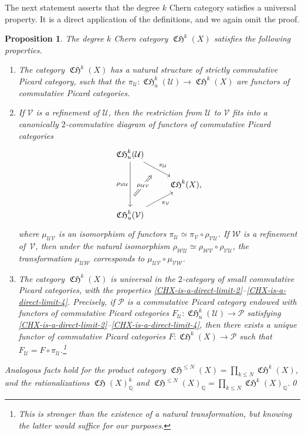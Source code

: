 \documentclass[JEP,XML,SOM,Unicode,published]{cedram}
\theoremstyle{plain}
\newtheorem{proposition}[theorem]{Proposition}
\theoremstyle{definition}
\newcommand{\QBbb}{\mathbb Q}
\newcommand{\Pcal}{\mathcal P}
\newcommand{\Ucal}{\mathcal U}
\newcommand{\Vcal}{\mathcal V}
\newcommand{\Wcal}{\mathcal W}
\DeclareMathOperator{\CHfrak}{\mathfrak{CH}}
\begin{document}
The next statement asserts that the degree $k$ Chern category satisfies a universal property. It is a direct application of the definitions, and we again omit the proof.
\begin{proposition}\label{prop:CHX-is-a-direct-limit}
The degree $k$ Chern category $\CHfrak^{k}(X)$ satisfies the following properties.
\begin{enumerate}
\item\label{CHX-is-a-direct-limit-2} The category $\CHfrak^{k}(X)$ has a natural structure of strictly commutative Picard category, such that the $\pi_{\Ucal}\colon\CHfrak_{u}^{k}(\Ucal)\to\CHfrak^{k}(X)$ are functors of commutative Picard categories.

\item\label{CHX-is-a-direct-limit-4} If $\Vcal$ is a refinement of $\Ucal$, then the restriction from $\Ucal$ to $\Vcal$ fits into a canonically $2$-commutative diagram of functors of commutative Picard categories
\begin{displaymath}
\begin{tikzcd}
\CHfrak_{u}^{k}(\Ucal) \ar[rd, "\pi_{\Ucal}"] \ar[rd, phantom, shift right = 0.2ex, ""{name=PIU}] \ar["\rho_{\Vcal\Ucal}"', dd] \ar[dd, phantom, shift right = 0.2ex, ""{name=PVU}, very near end] & \\
& \CHfrak^{k}(X), \\
\CHfrak_{u}^{k}(\Vcal) \ar[ru, "\pi_{\Vcal}"' ] \arrow[Rightarrow, from = PVU, to = PIU, "\mu_{\Ucal \Vcal}" description, shorten=2mm]
\end{tikzcd}
\end{displaymath}
where $\mu_{\Ucal\Vcal}$ is an isomorphism of functors $\pi_{\Ucal}\simeq\pi_{\Vcal}\circ\rho_{\Vcal\Ucal}$. If $\Wcal$ is a refinement of~$\Vcal$, then under the natural isomorphism $\rho_{\Wcal\Ucal}\simeq \rho_{\Wcal\Vcal}\circ\rho_{\Vcal\Ucal}$, the transformation $\mu_{\Ucal\Wcal}$ corresponds to $\mu_{\Ucal\Vcal}\circ\mu_{\Vcal\Wcal}$.
\item\label{CHX-is-a-direct-limit-5} The category $\CHfrak^{k}(X)$ is universal in the $2$-category of small commutative \hbox{Picard} categories, with the properties \eqref{CHX-is-a-direct-limit-2}--\eqref{CHX-is-a-direct-limit-4}. Precisely, if $\Pcal$ is a commutative Picard category endowed with functors of commutative Picard categories $F_{\Ucal}\colon\CHfrak_{u}^{k}(\Ucal)\to\Pcal$ satisfying \eqref{CHX-is-a-direct-limit-2}--\eqref{CHX-is-a-direct-limit-4}, then there exists a unique functor of commutative Picard categories $F\colon\CHfrak^{k}(X)\to\Pcal$ such that $F_{\Ucal}=F\circ\pi_{\Ucal}$.\footnote{This is stronger than the existence of a natural transformation, but knowing the latter would suffice for our purposes.}
\end{enumerate}
Analogous facts hold for the product category $\CHfrak^{\leq N}(X)=\prod_{k\leq N}\CHfrak^{k}(X)$, and the rationalizations $\CHfrak(X)_{\QBbb}^{k}$ and $\CHfrak^{\leq N}(X)_{\QBbb}=\prod_{k\leq N}\CHfrak^{k}(X)_{\QBbb}$.\qed
\end{proposition}
\end{document}
